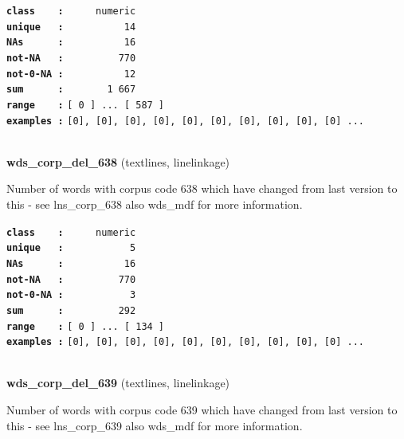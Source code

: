 \documentclass[]{article}
\begin{document}
\textbf{\texttt{class\ \ \ \ :}} \texttt{~~~~~numeric}\\
\textbf{\texttt{unique\ \ \ :}} \texttt{~~~~~~~~~~14}\\
\textbf{\texttt{NAs\ \ \ \ \ \ :}} \texttt{~~~~~~~~~~16}\\
\textbf{\texttt{not-NA\ \ \ :}} \texttt{~~~~~~~~~770}\\
\textbf{\texttt{not-0-NA\ :}} \texttt{~~~~~~~~~~12}\\
\textbf{\texttt{sum\ \ \ \ \ \ :}} \texttt{~~~~~~~1~667}\\
\textbf{\texttt{range\ \ \ \ :}}
\texttt{{[}\ 0\ {]}\ ...\ {[}\ 587\ {]}}\\
\textbf{\texttt{examples\ :}}
\texttt{{[}0{]},\ {[}0{]},\ {[}0{]},\ {[}0{]},\ {[}0{]},\ {[}0{]},\ {[}0{]},\ {[}0{]},\ {[}0{]},\ {[}0{]}\ ...}\\

~

\textbf{wds\_corp\_del\_638} (textlines, linelinkage)

Number of words with corpus code 638 which have changed from last
version to this - see lns\_corp\_638 also wds\_mdf for more information.

\textbf{\texttt{class\ \ \ \ :}} \texttt{~~~~~numeric}\\
\textbf{\texttt{unique\ \ \ :}} \texttt{~~~~~~~~~~~5}\\
\textbf{\texttt{NAs\ \ \ \ \ \ :}} \texttt{~~~~~~~~~~16}\\
\textbf{\texttt{not-NA\ \ \ :}} \texttt{~~~~~~~~~770}\\
\textbf{\texttt{not-0-NA\ :}} \texttt{~~~~~~~~~~~3}\\
\textbf{\texttt{sum\ \ \ \ \ \ :}} \texttt{~~~~~~~~~292}\\
\textbf{\texttt{range\ \ \ \ :}}
\texttt{{[}\ 0\ {]}\ ...\ {[}\ 134\ {]}}\\
\textbf{\texttt{examples\ :}}
\texttt{{[}0{]},\ {[}0{]},\ {[}0{]},\ {[}0{]},\ {[}0{]},\ {[}0{]},\ {[}0{]},\ {[}0{]},\ {[}0{]},\ {[}0{]}\ ...}\\

~

\textbf{wds\_corp\_del\_639} (textlines, linelinkage)

Number of words with corpus code 639 which have changed from last
version to this - see lns\_corp\_639 also wds\_mdf for more information.
\end{document}

